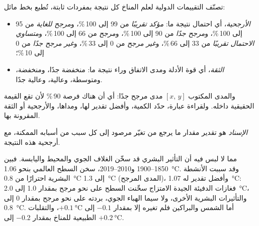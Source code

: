 \begin{method}\label{met:g12:climate-change:language}
تصنّف التقييمات الدولية لعلم المناخ كل نتيجة بمفردات
ثابتة، تُطبع بخط مائل:
\begin{itemize}
  \item \emph{الأرجحية}، أي احتمال نتيجة ما:
        \emph{مؤكد تقريبًا} من 99 إلى 100\,\%، و\emph{مرجح للغاية}
        من 95 إلى 100\,\%، و\emph{مرجح جدًا} من 90 إلى 100\,\%، و\emph{مرجح}
        من 66 إلى 100\,\%، و\emph{متساوي الاحتمال تقريبًا} من 33 إلى 66\,\%،
        و\emph{غير مرجح} من 0 إلى 33\,\%، و\emph{غير مرجح جدًا} من 0 إلى 10\,\%؛
  \item \emph{الثقة}، أي قوة الأدلة ومدى الاتفاق
        وراء نتيجة ما: منخفضة جدًا، ومنخفضة، ومتوسطة، وعالية، وعالية جدًا.
\end{itemize}
والمدى المكتوب $[x \text{, } y]$ مدى مرجح جدًا: أي أن هناك فرصة 90\,\%
لأن تقع القيمة الحقيقية داخله. ولقراءة عبارة، حدّد
الكمية، وأفضل تقدير لها، ومداها، والأرجحية أو
الثقة المقرونة بها.
\end{method}

\begin{definition}[الإسناد]\label{def:g12:climate-change:attribution}
\emph{الإسناد} هو تقدير مقدار ما يرجع من
تغيّر مرصود إلى كل سبب من أسبابه الممكنة، مع أرجحية
هذه النتيجة.
\end{definition}

\begin{proposition}\label{prop:g12:climate-change:attribution}
مما لا لبس فيه أن التأثير البشري قد سخّن الغلاف الجوي والمحيط
واليابسة. فبين 1850--1900 و2010--2019، سخن السطح العالمي
بنحو \qty{1.06}{\degreeCelsius}. وقد سببت الأنشطة البشرية احترارًا من
\qty{0.8}{\degreeCelsius} إلى \qty{1.3}{\degreeCelsius} (المدى المرجح)، وأفضل
تقدير له \qty{1.07}{\degreeCelsius}: فغازات الدفيئة الجيدة الامتزاج سخّنت السطح على نحو مرجح
بمقدار 1.0 إلى \qty{2.0}{\degreeCelsius}، والتأثيرات البشرية
الأخرى، ولا سيما الهباء الجوي، بردته على نحو مرجح بمقدار 0 إلى
\qty{0.8}{\degreeCelsius}. أما الشمس والبراكين فلم تغيره إلا بمقدار $-0.1$
إلى $+\qty{0.1}{\degreeCelsius}$، والتقلبات الطبيعية للمناخ
بمقدار $-0.2$ إلى $+\qty{0.2}{\degreeCelsius}$.
\end{proposition}

